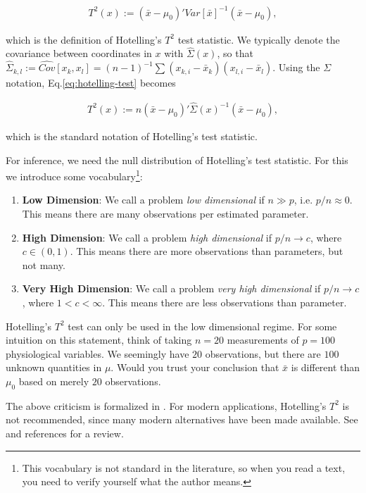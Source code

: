 \documentclass[]{book}
\providecommand{\tightlist}{%
  \setlength{\itemsep}{0pt}\setlength{\parskip}{0pt}}
\theoremstyle{definition}
\theoremstyle{definition}
\theoremstyle{definition}
\theoremstyle{remark}
\begin{document}
\begin{align}
  T^2(x):= (\bar{x}-\mu_0)' Var[\bar{x}]^{-1} (\bar{x}-\mu_0),
  \label{eq:hotelling-test}
\end{align}

which is the definition of Hotelling's \(T^2\) test statistic. We
typically denote the covariance between coordinates in \(x\) with
\(\hat \Sigma(x)\), so that
\(\widehat \Sigma_{k,l}:=\widehat {Cov}[x_k,x_l]=(n-1)^{-1} \sum (x_{k,i}-\bar x_k)(x_{l,i}-\bar x_l)\).
Using the \(\Sigma\) notation, Eq.\eqref{eq:hotelling-test} becomes

\begin{align}
  T^2(x):= n (\bar{x}-\mu_0)' \hat \Sigma(x)^{-1} (\bar{x}-\mu_0),
\end{align}

which is the standard notation of Hotelling's test statistic.

For inference, we need the null distribution of Hotelling's test
statistic. For this we introduce some vocabulary\footnote{This
  vocabulary is not standard in the literature, so when you read a text,
  you need to verify yourself what the author means.}:

\begin{enumerate}
\def\labelenumi{\arabic{enumi}.}
\tightlist
\item
  \textbf{Low Dimension}: We call a problem \emph{low dimensional} if
  \(n \gg p\), i.e. \(p/n \approx 0\). This means there are many
  observations per estimated parameter.
\item
  \textbf{High Dimension}: We call a problem \emph{high dimensional} if
  \(p/n \to c\), where \(c\in (0,1)\). This means there are more
  observations than parameters, but not many.
\item
  \textbf{Very High Dimension}: We call a problem \emph{very high
  dimensional} if \(p/n \to c\), where \(1<c<\infty\). This means there
  are less observations than parameter.
\end{enumerate}

Hotelling's \(T^2\) test can only be used in the low dimensional regime.
For some intuition on this statement, think of taking \(n=20\)
measurements of \(p=100\) physiological variables. We seemingly have
\(20\) observations, but there are \(100\) unknown quantities in
\(\mu\). Would you trust your conclusion that \(\bar x\) is different
than \(\mu_0\) based on merely \(20\) observations.

The above criticism is formalized in \citet{bai1996effect}. For modern
applications, Hotelling's \(T^2\) is not recommended, since many modern
alternatives have been made available. See \citet{rosenblatt2016better}
and references for a review.
\end{document}
